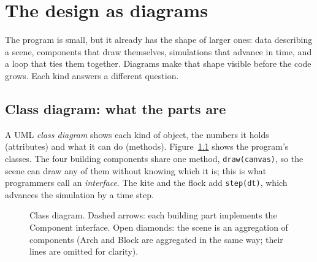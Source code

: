 \chapter{The design as diagrams}\label{ch:design}

The program is small, but it already has the shape of larger ones: data describing a scene, components that draw themselves, simulations that advance in time, and a loop that ties them together. Diagrams make that shape visible before the code grows. Each kind answers a different question.

\section{Class diagram: what the parts are}
A UML \emph{class diagram} shows each kind of object, the numbers it holds (attributes) and what it can do (methods). Figure~\ref{fig:uml} shows the program's classes. The four building components share one method, \texttt{draw(canvas)}, so the scene can draw any of them without knowing which it is; this is what programmers call an \emph{interface}. The kite and the flock add \texttt{step(dt)}, which advances the simulation by a time step.

\begin{figure}[H]\centering
{}
\caption{Class diagram. Dashed arrows: each building part implements the Component interface. Open diamonds: the scene is an aggregation of components (Arch and Block are aggregated in the same way; their lines are omitted for clarity).}\label{fig:uml}
\end{figure}

